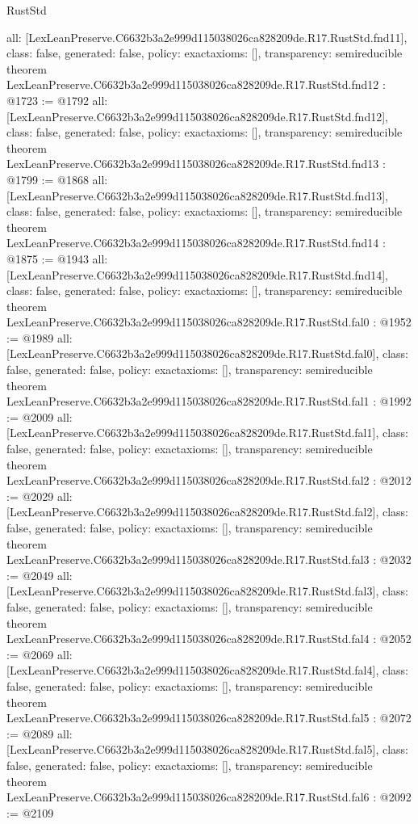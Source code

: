 \begin{lexlean}{RustStd}
\begin{coremodule}
{  all: [LexLeanPreserve.C6632b3a2e999d115038026ca828209de.R17.RustStd.fnd11],
  class: false,
  generated: false,
  policy: exact{axioms: []},
  transparency: semireducible
}
theorem LexLeanPreserve.C6632b3a2e999d115038026ca828209de.R17.RustStd.fnd12 : @1723 := @1792 {
  all: [LexLeanPreserve.C6632b3a2e999d115038026ca828209de.R17.RustStd.fnd12],
  class: false,
  generated: false,
  policy: exact{axioms: []},
  transparency: semireducible
}
theorem LexLeanPreserve.C6632b3a2e999d115038026ca828209de.R17.RustStd.fnd13 : @1799 := @1868 {
  all: [LexLeanPreserve.C6632b3a2e999d115038026ca828209de.R17.RustStd.fnd13],
  class: false,
  generated: false,
  policy: exact{axioms: []},
  transparency: semireducible
}
theorem LexLeanPreserve.C6632b3a2e999d115038026ca828209de.R17.RustStd.fnd14 : @1875 := @1943 {
  all: [LexLeanPreserve.C6632b3a2e999d115038026ca828209de.R17.RustStd.fnd14],
  class: false,
  generated: false,
  policy: exact{axioms: []},
  transparency: semireducible
}
theorem LexLeanPreserve.C6632b3a2e999d115038026ca828209de.R17.RustStd.fal0 : @1952 := @1989 {
  all: [LexLeanPreserve.C6632b3a2e999d115038026ca828209de.R17.RustStd.fal0],
  class: false,
  generated: false,
  policy: exact{axioms: []},
  transparency: semireducible
}
theorem LexLeanPreserve.C6632b3a2e999d115038026ca828209de.R17.RustStd.fal1 : @1992 := @2009 {
  all: [LexLeanPreserve.C6632b3a2e999d115038026ca828209de.R17.RustStd.fal1],
  class: false,
  generated: false,
  policy: exact{axioms: []},
  transparency: semireducible
}
theorem LexLeanPreserve.C6632b3a2e999d115038026ca828209de.R17.RustStd.fal2 : @2012 := @2029 {
  all: [LexLeanPreserve.C6632b3a2e999d115038026ca828209de.R17.RustStd.fal2],
  class: false,
  generated: false,
  policy: exact{axioms: []},
  transparency: semireducible
}
theorem LexLeanPreserve.C6632b3a2e999d115038026ca828209de.R17.RustStd.fal3 : @2032 := @2049 {
  all: [LexLeanPreserve.C6632b3a2e999d115038026ca828209de.R17.RustStd.fal3],
  class: false,
  generated: false,
  policy: exact{axioms: []},
  transparency: semireducible
}
theorem LexLeanPreserve.C6632b3a2e999d115038026ca828209de.R17.RustStd.fal4 : @2052 := @2069 {
  all: [LexLeanPreserve.C6632b3a2e999d115038026ca828209de.R17.RustStd.fal4],
  class: false,
  generated: false,
  policy: exact{axioms: []},
  transparency: semireducible
}
theorem LexLeanPreserve.C6632b3a2e999d115038026ca828209de.R17.RustStd.fal5 : @2072 := @2089 {
  all: [LexLeanPreserve.C6632b3a2e999d115038026ca828209de.R17.RustStd.fal5],
  class: false,
  generated: false,
  policy: exact{axioms: []},
  transparency: semireducible
}
theorem LexLeanPreserve.C6632b3a2e999d115038026ca828209de.R17.RustStd.fal6 : @2092 := @2109 {
}
\end{coremodule}
\end{lexlean}
